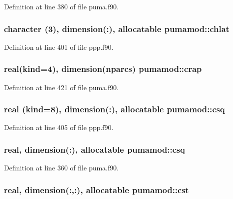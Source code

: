 \-Definition at line 380 of file puma.\-f90.

\hypertarget{classpumamod_a657def2270ed1f8c5137ba82b1d2cb69}{
\subsubsection[{chlat}]{\setlength{\rightskip}{0pt plus 5cm}character (3), dimension(\-:), allocatable {\bf pumamod\-::chlat}}}
\label{classpumamod_a657def2270ed1f8c5137ba82b1d2cb69}


\-Definition at line 401 of file ppp.\-f90.

\hypertarget{classpumamod_ade587d2c84caf94c7f54e8d358d42455}{
\subsubsection[{crap}]{\setlength{\rightskip}{0pt plus 5cm}real(kind=4), dimension(nparcs) {\bf pumamod\-::crap}}}
\label{classpumamod_ade587d2c84caf94c7f54e8d358d42455}


\-Definition at line 421 of file puma.\-f90.

\hypertarget{classpumamod_a5be628a4dc3f151cd3a2500954bd707a}{
\subsubsection[{csq}]{\setlength{\rightskip}{0pt plus 5cm}real (kind=8), dimension(\-:), allocatable {\bf pumamod\-::csq}}}
\label{classpumamod_a5be628a4dc3f151cd3a2500954bd707a}


\-Definition at line 405 of file ppp.\-f90.

\hypertarget{classpumamod_a4577fee5af720d3d5cee446b6bd36d0c}{
\subsubsection[{csq}]{\setlength{\rightskip}{0pt plus 5cm}real, dimension(\-:), allocatable {\bf pumamod\-::csq}}}
\label{classpumamod_a4577fee5af720d3d5cee446b6bd36d0c}


\-Definition at line 360 of file puma.\-f90.

\hypertarget{classpumamod_aec021878423837a34bb3de710083412f}{
\subsubsection[{cst}]{\setlength{\rightskip}{0pt plus 5cm}real, dimension(\-:,\-:), allocatable {\bf pumamod\-::cst}}}
\label{classpumamod_aec021878423837a34bb3de710083412f}


